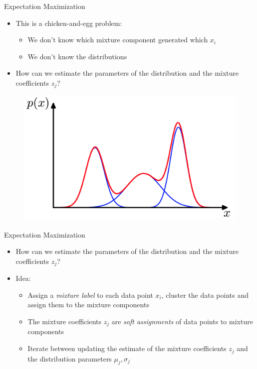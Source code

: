 \begin{frame}{Expectation Maximization}{}
	\begin{itemize}
		\item This is a chicken-and-egg problem:
		\begin{itemize}
			\item We don't know which mixture component generated which $x_i$\\
			\item We don't know the distributions
		\end{itemize}
		\item How can we estimate the parameters of the distribution and the mixture coefficients $z_j$?
	\end{itemize}
	\begin{figure}
		\centering
		\includegraphics[scale=0.25]{04_density_estimation/02_img/gaussianmixturedistribution}
	\end{figure}
\end{frame}

\begin{frame}{Expectation Maximization}{}
	\begin{itemize}
		\item How can we estimate the parameters of the distribution and the mixture coefficients $z_j$?
		\item Idea:
		\begin{itemize}
			\item Assign a \textit{mixture label} to each data point $x_i$, cluster the data points and assign them to the mixture components
			\item The mixture coefficients $z_j$ are \textit{soft assignments} of data points to mixture components
			\item Iterate between updating the estimate of the mixture coefficients $z_j$ and the distribution parameters $\mu_j, \sigma_j$
		\end{itemize}
	\end{itemize}
\end{frame}

